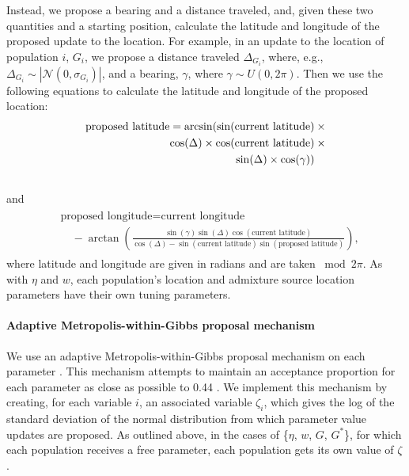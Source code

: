 \documentclass[12pt]{article}
\newcommand{\identifyadmixsource}[1]{{#1^{*}}}
\begin{document}
Instead, we propose a bearing and a distance traveled, and, given these two quantities and a starting position, calculate the latitude and longitude of the proposed update to the location.  For example, in an update to the location of population $i$, $G_i$, we propose a distance traveled $\Delta_{{G}_i}$, where, e.g., $\Delta_{G_i}  \sim | \mathcal{N}(0,\sigma_{{G}_i})|$, and a bearing, $\gamma$, where $\gamma \sim U(0,2\pi)$.  Then we use the following equations to calculate the latitude and longitude of the proposed location:
\begin{align}
\text{proposed latitude} = \arcsin(\sin(\text{current latitude}) \: &\times\\  \notag
					\cos(\Delta) \times \cos(\text{current latitude}) \:&\times\\  \notag
					\sin(\Delta) \times \cos(\gamma))   \:&\phantom{\times}\\  \notag
\end{align}
and
\begin{align}
  \begin{split}
    & \text{proposed longitude} =  \text{current longitude} \\
    & \quad {} - \arctan\left(
                        \frac{
							\sin(\gamma)
							\sin(\Delta) 
                            \cos(\text{current latitude}) 
                          }{
                           \cos(\Delta) - 
                           \sin(\text{current latitude}) 
                          \sin(\text{proposed latitude})
                        } \right) ,
    \end{split}
\end{align}
where latitude and longitude are given in radians and are taken ${}\bmod 2\pi$.
As with $\eta$ and $w$, each population's location and admixture source location parameters have their own tuning parameters.


\paragraph{Adaptive Metropolis-within-Gibbs proposal mechanism}
We use an adaptive Metropolis-within-Gibbs proposal mechanism on each parameter \citep{roberts2009examples,rosenthal2010_optimal}.  This mechanism attempts to maintain an acceptance proportion for each parameter as close as possible to 0.44 \citep[optimal for one-dimensional proposal mechanisms;][]{Roberts1997,Roberts2001}.  We implement this mechanism by creating, for each variable $i$, an associated variable $\zeta_i$, which gives the log of the standard deviation of the normal distribution from which parameter value updates are proposed.  As outlined above, in the cases of \{$\eta$, $w$, $G$, $\identifyadmixsource{G}$\}, for which each population receives a free parameter, each population gets its own value of $\zeta$.  
\end{document}
